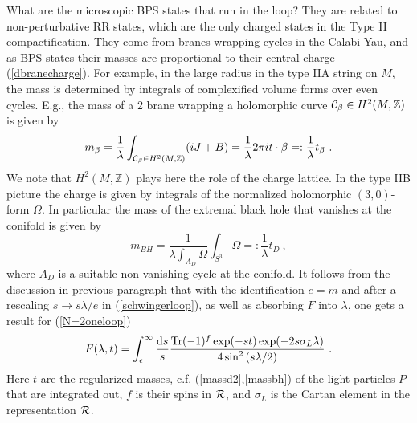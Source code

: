 \documentclass[12pt]{article}
\newcommand{\ds}{\displaystyle}
\begin{document}
What are the microscopic BPS states that run in the loop? They are
related to non-perturbative RR states, which are the only charged
states in the Type II compactification. They come from branes
wrapping cycles in the Calabi-Yau, and as BPS states their masses
are proportional to their central charge (\ref{dbranecharge}). For
example, in the large radius in the type IIA string on $M$, the
mass is determined by integrals of complexified volume forms over
even cycles. E.g., the mass of a 2 brane wrapping a holomorphic
curve ${\cal C}_\beta\in  H^2(M,\mathbb{Z})$ is given by
\begin{equation}
m_\beta=\frac{1}{\lambda} \int_{ {\cal C}_\beta\in H^2(M,\mathbb{Z})} (iJ+B)=
\frac{1}{\lambda} 2 \pi i t\cdot \beta =:\frac{1}{\lambda}t_\beta\ .
\label{massd2}
\end{equation}
We note that $H^2(M,\mathbb{Z})$ plays here the role of the charge
lattice. In the type IIB picture the charge is given by integrals of the
normalized holomorphic $(3,0)$-form $\Omega$. In particular the mass of the extremal
black hole that vanishes at the conifold  is given by
\begin{equation}
m_{BH}=\frac{1}{\lambda \int_{A_D} \Omega} \int_{S^3} \Omega =:\frac{1}{\lambda}t_D\ ,
\label{massbh}
\end{equation}
where $A_D$ is a suitable non-vanishing cycle at the conifold. It
follows from the discussion in previous paragraph that with the
identification $e=m$ and  after a rescaling $s\rightarrow s
\lambda / e$ in (\ref{schwingerloop}), as well as absorbing $F$
into $\lambda$, one gets a result for (\ref{N=2oneloop})
\begin{equation}
F(\lambda, t)= \int_{\epsilon}^\infty \frac{{\rm d} s}{s} \ds{{
{\rm Tr} (-1)^f \exp({- s t }) \exp({-2 s  \sigma_L
\lambda})}\over 4 \sin^2\ds{\left( s \lambda /2\right)}}\ .
\label{n=2loop}
\end{equation}
Here $t$ are the regularized masses, c.f.
(\ref{massd2},\ref{massbh}) of the light particles $P$ that are
integrated out, $f$ is their spins in ${\cal R}$, and $\sigma_L$
is the Cartan element in the representation  ${\cal R}$.
\end{document}
